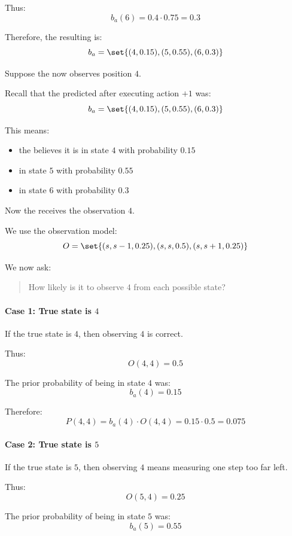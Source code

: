 Thus:
\[
b_a(6)
=
0.4\cdot 0.75
=
0.3
\]

Therefore, the resulting  is:
\[
b_a
=
\set{
(4,0.15),
(5,0.55),
(6,0.3)
}
\]

Suppose the  now observes position $4$.

Recall that the predicted  after executing action $+1$ was:
\[
b_a
=
\set{
(4,0.15),
(5,0.55),
(6,0.3)
}
\]

This means:
\begin{itemize}
    \item the  believes it is in state $4$ with probability $0.15$
    \item in state $5$ with probability $0.55$
    \item in state $6$ with probability $0.3$
\end{itemize}

Now the  receives the observation $4$.

We use the observation model:
\[
O
=
\set{
(s,s-1,0.25),
(s,s,0.5),
(s,s+1,0.25)
}
\]

We now ask:

\begin{quote}
How likely is it to observe $4$ from each possible state?
\end{quote}

\paragraph{Case 1: True state is $4$}

If the true state is $4$, then observing $4$ is correct.

Thus:
\[
O(4,4)=0.5
\]

The prior probability of being in state $4$ was:
\[
b_a(4)=0.15
\]

Therefore:
\[
P(4,4)
=
b_a(4)\cdot O(4,4)
=
0.15\cdot 0.5
=
0.075
\]

\paragraph{Case 2: True state is $5$}

If the true state is $5$, then observing $4$ means measuring one step too far left.

Thus:
\[
O(5,4)=0.25
\]

The prior probability of being in state $5$ was:
\[
b_a(5)=0.55
\]

